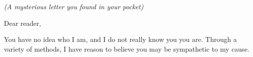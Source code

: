 \documentclass[white]{guildcamp1}
\begin{document}
\name{\wUtopianLetter{}}

\emph{(A mysterious letter you found in your pocket)}

Dear reader,

You have no idea who I am, and I do not really know you you are. Through a variety of methods, I have reason to believe you may be sympathetic to my cause.
\end{document}

